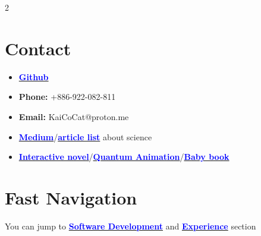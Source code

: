 \documentclass[11pt]{article}
\begin{document}
\begin{multicols*}{2}
    





\section*{Contact}
{\footnotesize
\begin{itemize}[noitemsep]
    \item \href{https://github.com/Kuo-TingKai}{\textbf{\textcolor{blue}{Github}}}
    \item \textbf{Phone:} +886-922-082-811
    \item \textbf{Email:} KaiCoCat@proton.me
    \item \href{https://medium.com/@nehsm30126}{\textbf{\textcolor{blue}{Medium}}}/\href{https://www.overleaf.com/read/xzdtxtgxtnby#49163b}{\textbf{\textcolor{blue}{article list}}} about science
    \item \href{https://kuo-tingkai.github.io/theorem-dream/}{\textbf{\textcolor{blue}{Interactive novel}}}/\href{https://kuo-tingkai.github.io/QM.THREE/}{\textbf{\textcolor{blue}{Quantum Animation}}}/\href{https://kuo-tingkai.github.io/BubbleBook/}{\textbf{\textcolor{blue}{Baby book}}}
\end{itemize}
}

\section*{Fast Navigation}
You can jump to \href{#software-dev}{\textbf{\textcolor{blue}{Software Development}}} and \href{#experience}{\textbf{\textcolor{blue}{Experience}}} section\\


\end{multicols*}
\end{document}
